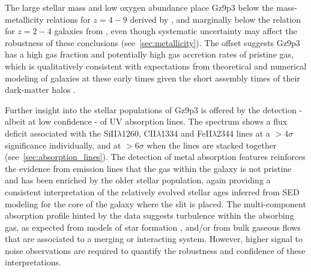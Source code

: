 \documentclass[sn-mathphys]{sn-jnl}%
\theoremstyle{thmstyleone}%
\theoremstyle{thmstyletwo}%
\theoremstyle{thmstylethree}%
\begin{document}
The large stellar mass and low oxygen abundance place Gz9p3 below the mass-metallicity relations for $z=4-9$ derived by  \cite{Nakajima23}, and marginally below the relation for $z=2-4$ galaxies from \cite{Sanders21, Maiolino_2008}, even though systematic uncertainty may affect the robustness of these conclusions (see~\ref{sec:metallicity}). The offset suggests Gz9p3 has a high gas fraction and potentially high gas accretion rates of pristine gas, which is qualitatively consistent with expectations from theoretical and numerical modeling of galaxies at these early times given the short assembly times of their dark-matter halos \cite{Mason2015}. 

Further insight into the stellar populations of Gz9p3 is offered by the detection - albeit at low confidence - of UV absorption lines. The spectrum shows a flux deficit associated with the SiII$\lambda$1260, CII$\lambda$1334 and FeII$\lambda$2344 lines at a $>4\sigma$ significance individually, and at  $>6\sigma$ when the lines are stacked together (see~\ref{sec:absorption_lines}). The detection of metal absorption features reinforces the evidence from emission lines that the gas within the galaxy is not pristine and has been enriched by the older stellar population, again providing a consistent interpretation of the relatively evolved stellar ages inferred from SED modeling for the core of the galaxy where the slit is placed. The multi-component absorption profile hinted by the data suggests turbulence within the absorbing gas, as expected from models of star formation \citep{Padoan02,Krumholz05}, and/or from bulk gaseous flows that are associated to a merging or interacting system. However, higher signal to noise observations are required to quantify the robustness and confidence of these interpretations.
\end{document}
